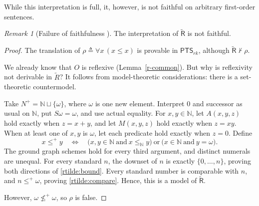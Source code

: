 \documentclass{article}
\theoremstyle{definition}
\theoremstyle{remark}
\newtheorem*{remark}{Remark}
\newcommand{\PTS}{\mathsf{PTS}_{rk}}
\newcommand{\Rt}{\widetilde{\mathsf R}}
\begin{document}
While this interpretation is full, it, however, is not
faithful on arbitrary first-order sentences.

\begin{remark}[Failure of faithfulness
    ]
    The interpretation of $\Rt$ is not faithful.
\end{remark}
\begin{proof}
    The translation of
    $\rho\triangleq\forall x\,(x\le x)$ is provable in
    $\PTS$, although $\Rt\nvdash\rho$.

    We already know that $O$ is reflexive
    (Lemma~\ref{r-common}). But why is reflexivity not
    derivable in $\widetilde R$? It follows from
    model-theoretic considerations: there is a
    set-theoretic countermodel.

    Take $N^+=\mathbb N\sqcup\{\omega\}$, where
    $\omega$ is one new element. Interpret $0$ and
    successor as usual on $\mathbb N$, put
    $S\omega=\omega$, and use actual equality. For
    $x,y\in\mathbb N$, let $A(x,y,z)$ hold exactly when
    $z=x+y$, and let $M(x,y,z)$ hold exactly when
    $z=xy$. When at least one of $x,y$ is $\omega$, let
    each predicate hold exactly when $z=0$. Define
    \[
        x\le^+ y\quad\Longleftrightarrow\quad
        \bigl(x,y\in\mathbb N\ \text{and}
        \ x\le_{\mathbb N}y\bigr)
        \ \text{or}\ \bigl(x\in\mathbb N\ \text{and}
        \ y=\omega\bigr).
    \]
    The ground graph schemes hold for every third
    argument, and distinct numerals are unequal. For
    every standard $n$, the downset of $n$ is exactly
    $\{0,\ldots,n\}$, proving both directions of
    \eqref{rtilde:bound}. Every standard number is
    comparable with $n$, and $n\le^+\omega$, proving
    \eqref{rtilde:compare}. Hence, this is a model of
    $\Rt$.

    However, $\omega\not\le^+\omega$, so $\rho$ is
    false.
\end{proof}
\end{document}
